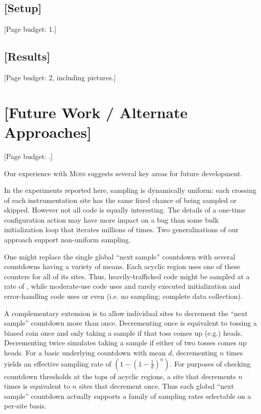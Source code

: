 \documentclass{acm_proc_article-sp}
\newcommand{\moss}{\textsc{Moss}\xspace}
\newcommand{\placeholder}[1]{{\color[cmyk]{0,0.61,0.87,0}[#1]}}
\begin{document}
\subsection{\placeholder{Setup}}
\label{sec:experiments:setup}

\placeholder{Page budget: 1.}



\subsection{\placeholder{Results}}
\label{sec:experiments:results}

\placeholder{Page budget: 2, including pictures.}


\section{\placeholder{Future Work / Alternate Approaches}}
\label{sec:future-work}

\placeholder{Page budget: .}

Our experience with \moss suggests several key areas for future
development.

In the experiments reported here, sampling is dynamically uniform:
each crossing of each instrumentation site has the same fixed chance
of being sampled or skipped.  However not all code is equally
interesting.  The details of a one-time configuration action may have
more impact on a bug than some bulk initialization loop that iterates
millions of times.  Two generalizations of our approach support
non-uniform sampling.

One might replace the single global ``next sample'' countdown with
several countdowns having a variety of means.  Each acyclic region
uses one of these counters for all of its sites.  Thus,
heavily-trafficked code might be sampled at a rate of
, while moderate-use code uses  and
rarely executed initialization and error-handling code uses
 or even  (i.e. no sampling; complete
data collection).

A complementary extension is to allow individual sites to decrement
the ``next sample'' countdown more than once.  Decrementing once is
equivalent to tossing a biased coin once and only taking a sample if
that toss comes up (e.g.) heads.  Decrementing twice simulates taking
a sample if either of two tosses comes up heads.  For a basic
underlying countdown with mean $d$, decrementing $n$ times yields an
effective sampling rate of $(1 - (1 - \frac{1}{d})^n)$.  For purposes
of checking countdown thresholds at the tops of acyclic regions, a
site that decrements $n$ times is equivalent to $n$ sites that
decrement once.  Thus each global ``next sample'' countdown actually
supports a family of sampling rates selectable on a per-site basis.
\end{document}
